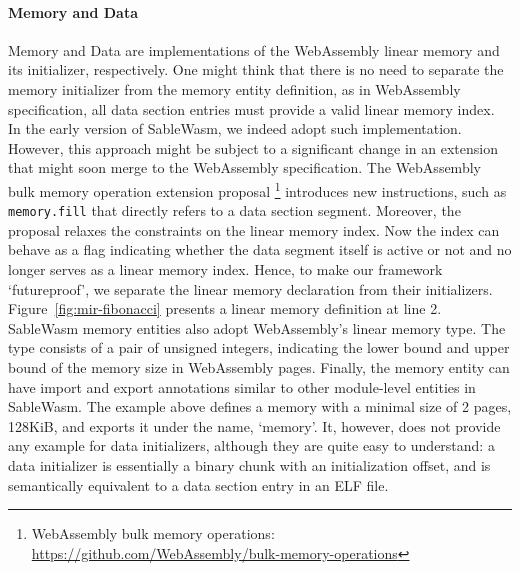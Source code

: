 \paragraph{Memory and Data}
Memory and Data are implementations of the WebAssembly linear memory and its
initializer, respectively. One might think that there is no need to separate the
memory initializer from the memory entity definition, as in WebAssembly
specification, all data section entries must provide a valid linear memory
index. In the early version of SableWasm, we indeed adopt such implementation.
However, this approach might be subject to a significant change in an extension
that might soon merge to the WebAssembly specification. The WebAssembly bulk
memory operation extension proposal \footnote{WebAssembly bulk memory
  operations: \\\url{https://github.com/WebAssembly/bulk-memory-operations}}
introduces new instructions, such as \texttt{memory.fill} that directly refers
to a data section segment. Moreover, the proposal relaxes the constraints on the
linear memory index. Now the index can behave as a flag indicating whether the
data segment itself is active or not and no longer serves as a linear memory
index. Hence, to make our framework `futureproof', we separate the linear memory
declaration from their initializers. Figure~\ref{fig:mir-fibonacci} presents a
linear memory definition at line 2. SableWasm memory entities also adopt
WebAssembly's linear memory type. The type consists of a pair of unsigned
integers, indicating the lower bound and upper bound of the memory size in
WebAssembly pages. Finally, the memory entity can have import and export
annotations similar to other module-level entities in SableWasm. The example
above defines a memory with a minimal size of 2 pages, 128KiB, and exports it
under the name, `memory'. It, however, does not provide any example for data
initializers, although they are quite easy to understand: a data initializer is
essentially a binary chunk with an initialization offset, and is semantically
equivalent to a data section entry in an ELF file.

